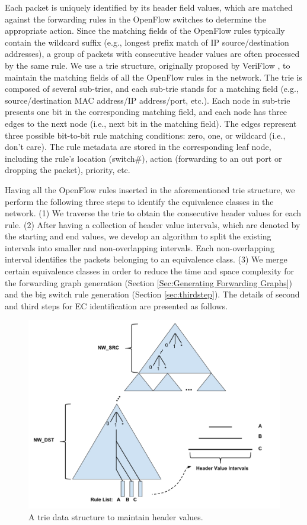 Each packet is uniquely identified by its header field values, which are matched against the forwarding rules in the OpenFlow switches to determine the appropriate action. Since the matching fields of the OpenFlow rules typically contain the wildcard suffix (e.g., longest prefix match of IP source/destination addresses), a group of packets with consecutive header values are often processed by the same rule. We use a trie structure, originally proposed by VeriFlow \cite{Veriflow}, to maintain the matching fields of all the OpenFlow rules in the network. The trie is composed of several sub-tries, and each sub-trie stands for a matching field (e.g., source/destination MAC address/IP address/port, etc.). Each node in sub-trie presents one bit in the corresponding matching field, and each node has three edges to the next node (i.e., next bit in the  matching field). The edges represent three possible bit-to-bit rule matching conditions: zero, one, or wildcard (i.e., don't care). The rule metadata are stored in the corresponding leaf node, including the rule's location (switch\#), action (forwarding to an out port or dropping the packet), priority, etc. 

Having all the OpenFlow rules inserted in the aforementioned trie structure, we perform the following three steps to identify the equivalence classes in the network. (1) We traverse the trie to obtain the consecutive header values for each rule. (2) After having a collection of header value intervals, which are denoted by the starting and end values, we develop an algorithm to split the existing intervals into smaller and non-overlapping intervals. Each non-overlapping interval identifies the packets belonging to an equivalence class. (3) We merge certain equivalence classes in order to reduce the time and space complexity for the forwarding graph generation (Section \ref{Sec:Generating Forwarding Graphs}) and the big switch rule generation (Section \ref{sec:thirdstep}). The details of second and third steps for EC identification are presented as follows.

\begin{figure}[t]
\centering
\includegraphics[scale=.35]{figures/trie.pdf}
\caption{A trie data structure to maintain header values.}
\label{Fig:Trie}
\end{figure}
\fi 

